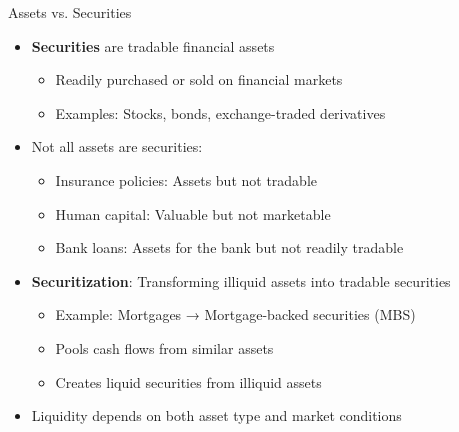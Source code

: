 \documentclass[10pt]{beamer}
\begin{document}
\begin{frame}{Assets vs. Securities}
  \begin{itemize}[<+->]
    \item \textbf{Securities} are tradable financial assets
      \begin{itemize}
        \item Readily purchased or sold on financial markets
        \item Examples: Stocks, bonds, exchange-traded derivatives
      \end{itemize}
    \item Not all assets are securities:
      \begin{itemize}
        \item Insurance policies: Assets but not tradable
        \item Human capital: Valuable but not marketable
        \item Bank loans: Assets for the bank but not readily tradable
      \end{itemize}
    \item \textbf{Securitization}: Transforming illiquid assets into tradable securities
      \begin{itemize}
        \item Example: Mortgages → Mortgage-backed securities (MBS)
        \item Pools cash flows from similar assets
        \item Creates liquid securities from illiquid assets
      \end{itemize}
    \item Liquidity depends on both asset type and market conditions
  \end{itemize}
\end{frame}
\end{document}
